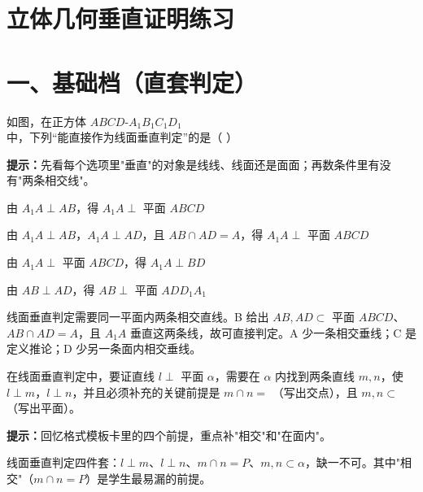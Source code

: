 \documentclass{exam-zh}
\begin{document}
\section*{立体几何垂直证明练习}

\section*{一、基础档（直套判定）}


\begin{question}[points=5]
  如图，在正方体 $ABCD\text{-}A_1B_1C_1D_1$ 中，下列“能直接作为线面垂直判定”的是（    ）
  \begin{hintbox}
\textbf{提示：}先看每个选项里"垂直"的对象是线线、线面还是面面；再数条件里有没有"两条相交线"。\end{hintbox}

  \begin{choices}
    \item 由 $A_1A\perp AB$，得 $A_1A\perp$ 平面 $ABCD$
    \item 由 $A_1A\perp AB$，$A_1A\perp AD$，且 $AB\cap AD=A$，得 $A_1A\perp$ 平面 $ABCD$
    \item 由 $A_1A\perp$ 平面 $ABCD$，得 $A_1A\perp BD$
    \item 由 $AB\perp AD$，得 $AB\perp$ 平面 $ADD_1A_1$
  \end{choices}
  \paren[B]
  \begin{solutionblock}
    线面垂直判定需要同一平面内两条相交直线。B 给出 $AB,AD\subset$ 平面 $ABCD$、$AB\cap AD=A$，且 $A_1A$ 垂直这两条线，故可直接判定。A 少一条相交垂线；C 是定义推论；D 少另一条面内相交垂线。
  \end{solutionblock}
\end{question}



\begin{question}[points=5]
  在线面垂直判定中，要证直线 $l\perp$ 平面 $\alpha$，需要在 $\alpha$ 内找到两条直线 $m,n$，使 $l\perp m$，$l\perp n$，并且必须补充的关键前提是 $m\cap n=$ \underline{\quad\quad\quad}（写出交点），且 $m,n\subset$ \underline{\quad\quad\quad}（写出平面）。
  \begin{hintbox}
\textbf{提示：}回忆格式模板卡里的四个前提，重点补"相交"和"在面内"。\end{hintbox}

  \begin{solutionblock}
    线面垂直判定四件套：$l\perp m$、$l\perp n$、$m\cap n=P$、$m,n\subset\alpha$，缺一不可。其中"相交"（$m\cap n=P$）是学生最易漏的前提。
  \end{solutionblock}
\end{question}
\end{document}
